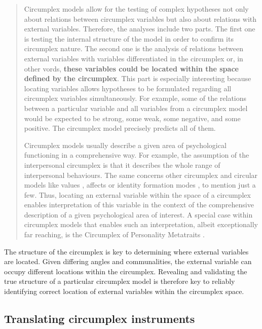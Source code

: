 \documentclass[
  authoryear,
  preprint,
  3p]{elsarticle}
\begin{document}
\begin{quote}
Circumplex models allow for the testing of complex hypotheses not only
about relations between circumplex variables but also about relations
with external variables. Therefore, the analyses include two parts. The
first one is testing the internal structure of the model in order to
confirm its circumplex nature. The second one is the analysis of
relations between external variables with variables differentiated in
the circumplex or, in other vords, \textbf{these variables could be
located within the space defined by the circumplex}. This part is
especially interesting because locating variables allows hypotheses to
be formulated regarding all circumplex variables simultaneously. For
example, some of the relations between a particular variable and all
variables from a circumplex model would be expected to be strong, some
weak, some negative, and some positive. The circumplex model precisely
predicts all of them.

Circumplex models usually describe a given area of psychological
functioning in a comprehensive way. For example, the assumption of the
interpersonal circumplex \citep{Wiggins1979} is that it describes the
whole range of interpersonal behaviours. The same concerns other
circumplex and circular models like values \citep{Schwartz2012}, affects
\citep{Russell1980circumplex} or identity formation modes
\citep{Cieciuch2017}, to mention just a few. Thus, locating an external
variable within the space of a circumplex enables interpretation of this
variable in the context of the comprehensive description of a given
psychological area of interest. A special case within circumplex models
that enables such an interpretation, albeit exceptionally far reaching,
is the Circumplex of Personality Metatraits
\citep{Strus2017, Strus2014}.
\end{quote}

The structure of the circumplex is key to determining where external
variables are located. Given differing angles and communalities, the
external variable can occupy different locations within the circumplex.
Revealing and validating the true structure of a particular circumplex
model is therefore key to reliably identifying correct location of
external variables within the circumplex space.

\subsection{Translating circumplex
instruments}\label{translating-circumplex-instruments}
\end{document}
